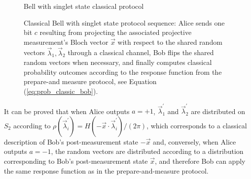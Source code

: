 \begin{figure}[tb]
\begin{center}
\begin{msc}[msc keyword=, instance width=3.6cm]{Bell with singlet state classical protocol}
\nextlevel[3]
\nextlevel[3]
\nextlevel[1]
\nextlevel[3]
\nextlevel[2]
\end{msc}
\end{center}
\caption{Classical Bell with singlet state protocol sequence: Alice sends one bit $c$ resulting from projecting the associated projective measurement's Bloch vector $\vec{x}$ with respect to the shared random vectors $\vec{\lambda}_1, \vec{\lambda}_2$ through a classical channel, Bob flips the shared random vectors when necessary, and finally computes classical probability outcomes according to the response function from the prepare-and measure protocol, see Equation (\ref{eq:prob_classic_bob}).}
\label{fig:msc_bell}
\end{figure}

It can be proved that when Alice outputs $a=+1$, $\vec{\lambda}^{\prime}_1$ and $\vec{\lambda}^{\prime}_2$ are distributed on $S_2$ according to $\rho(\vec{\lambda}^{\prime}_i) = H(-\vec{x} \cdot \vec{\lambda}^{\prime}_i)/(2\pi)$, which corresponds to a classical description of Bob's post-measurement state $-\vec{x}$ and, conversely, when Alice outputs $a=-1$, the random vectors are distributed according to a distribution corresponding to Bob's post-measurement state $\vec{x}$, and therefore Bob can apply the same response function as in the prepare-and-measure protocol. %